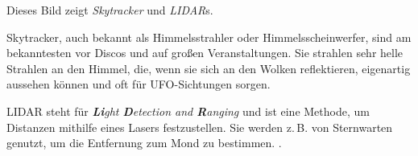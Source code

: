 \documentclass{scrartcl}
\begin{document}
Dieses Bild zeigt \textit{Skytracker} und \textit{LIDAR}s.

Skytracker, auch bekannt als Himmelsstrahler oder Himmelsscheinwerfer, sind am bekanntesten vor Discos und auf großen Veranstaltungen. Sie strahlen sehr helle Strahlen an den Himmel, die, wenn sie sich an den Wolken reflektieren, eigenartig aussehen können und oft für UFO-Sichtungen sorgen. 

LIDAR steht für \textit{\textbf{Li}ght \textbf{D}etection and \textbf{R}anging} und ist eine Methode, um Distanzen mithilfe eines Lasers festzustellen. Sie werden z.\,B. von Sternwarten genutzt, um die Entfernung zum Mond zu bestimmen.  .
\end{document}
